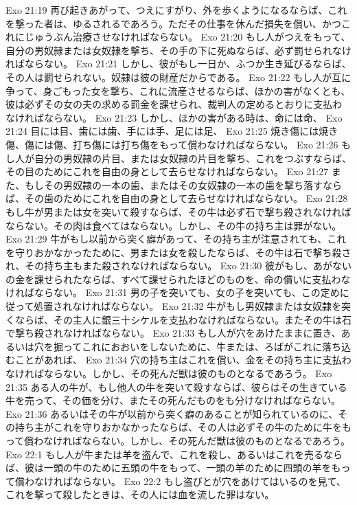 Exo 21:19  再び起きあがって、つえにすがり、外を歩くようになるならば、これを撃った者は、ゆるされるであろう。ただその仕事を休んだ損失を償い、かつこれにじゅうぶん治療させなければならない。
Exo 21:20  もし人がつえをもって、自分の男奴隷または女奴隷を撃ち、その手の下に死ぬならば、必ず罰せられなければならない。
Exo 21:21  しかし、彼がもし一日か、ふつか生き延びるならば、その人は罰せられない。奴隷は彼の財産だからである。
Exo 21:22  もし人が互に争って、身ごもった女を撃ち、これに流産させるならば、ほかの害がなくとも、彼は必ずその女の夫の求める罰金を課せられ、裁判人の定めるとおりに支払わなければならない。
Exo 21:23  しかし、ほかの害がある時は、命には命、
Exo 21:24  目には目、歯には歯、手には手、足には足、
Exo 21:25  焼き傷には焼き傷、傷には傷、打ち傷には打ち傷をもって償わなければならない。
Exo 21:26  もし人が自分の男奴隷の片目、または女奴隷の片目を撃ち、これをつぶすならば、その目のためにこれを自由の身として去らせなければならない。
Exo 21:27  また、もしその男奴隷の一本の歯、またはその女奴隷の一本の歯を撃ち落すならば、その歯のためにこれを自由の身として去らせなければならない。
Exo 21:28  もし牛が男または女を突いて殺すならば、その牛は必ず石で撃ち殺されなければならない。その肉は食べてはならない。しかし、その牛の持ち主は罪がない。
Exo 21:29  牛がもし以前から突く癖があって、その持ち主が注意されても、これを守りおかなかったために、男または女を殺したならば、その牛は石で撃ち殺され、その持ち主もまた殺されなければならない。
Exo 21:30  彼がもし、あがないの金を課せられたならば、すべて課せられたほどのものを、命の償いに支払わなければならない。
Exo 21:31  男の子を突いても、女の子を突いても、この定めに従って処置されなければならない。
Exo 21:32  牛がもし男奴隷または女奴隷を突くならば、その主人に銀三十シケルを支払わなければならない。またその牛は石で撃ち殺されなければならない。
Exo 21:33  もし人が穴をあけたままに置き、あるいは穴を掘ってこれにおおいをしないために、牛または、ろばがこれに落ち込むことがあれば、
Exo 21:34  穴の持ち主はこれを償い、金をその持ち主に支払わなければならない。しかし、その死んだ獣は彼のものとなるであろう。
Exo 21:35  ある人の牛が、もし他人の牛を突いて殺すならば、彼らはその生きている牛を売って、その価を分け、またその死んだものをも分けなければならない。
Exo 21:36  あるいはその牛が以前から突く癖のあることが知られているのに、その持ち主がこれを守りおかなかったならば、その人は必ずその牛のために牛をもって償わなければならない。しかし、その死んだ獣は彼のものとなるであろう。
Exo 22:1  もし人が牛または羊を盗んで、これを殺し、あるいはこれを売るならば、彼は一頭の牛のために五頭の牛をもって、一頭の羊のために四頭の羊をもって償わなければならない。
Exo 22:2  もし盗びとが穴をあけてはいるのを見て、これを撃って殺したときは、その人には血を流した罪はない。
